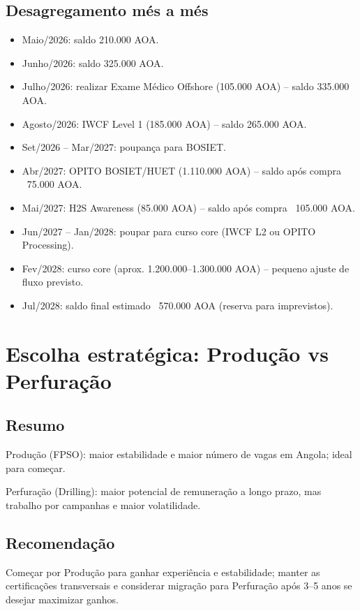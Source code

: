 \documentclass[11pt,openany]{book}
\begin{document}
\subsection{Desagregamento m\'es a m\'es}
\begin{itemize}
  \item Maio/2026: saldo 210.000 AOA.
  \item Junho/2026: saldo 325.000 AOA.
  \item Julho/2026: realizar Exame M\'edico Offshore (105.000 AOA) -- saldo 335.000 AOA.
  \item Agosto/2026: IWCF Level 1 (185.000 AOA) -- saldo 265.000 AOA.
  \item Set/2026 -- Mar/2027: poupan\c{c}a para BOSIET.
  \item Abr/2027: OPITO BOSIET/HUET (1.110.000 AOA) -- saldo ap\'os compra ~75.000 AOA.
  \item Mai/2027: H2S Awareness (85.000 AOA) -- saldo ap\'os compra ~105.000 AOA.
  \item Jun/2027 -- Jan/2028: poupar para curso core (IWCF L2 ou OPITO Processing).
  \item Fev/2028: curso core (aprox. 1.200.000--1.300.000 AOA) -- pequeno ajuste de fluxo previsto.
  \item Jul/2028: saldo final estimado ~570.000 AOA (reserva para imprevistos).
\end{itemize}

\section{Escolha estrat\'egica: Produ\c{c}\~ao vs Perfura\c{c}\~ao}
\subsection{Resumo}
Produ\c{c}\~ao (FPSO): maior estabilidade e maior n\'umero de vagas em Angola; ideal para come\c{c}ar.

Perfura\c{c}\~ao (Drilling): maior potencial de remunera\c{c}\~ao a longo prazo, mas trabalho por campanhas e maior volatilidade.

\subsection{Recomenda\c{c}\~ao}
Come\c{c}ar por Produ\c{c}\~ao para ganhar experi\^encia e estabilidade; manter as certifica\c{c}\~oes transversais e considerar migra\c{c}\~ao para Perfura\c{c}\~ao ap\'os 3--5 anos se desejar maximizar ganhos.
\end{document}
